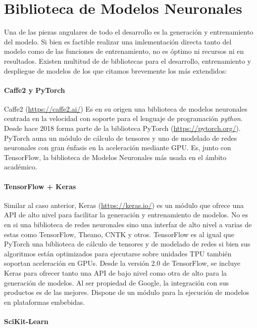 \section{Biblioteca de Modelos Neuronales} \label{sec:req:tflite}

Una de las piezas angulares de todo el desarrollo es la generación y entrenamiento del modelo. Si bien es factible realizar una imlementación directa tanto del modelo como de las funciones de entrenamiento, no es óptimo ni recursos ni en resultados. Existen multitud de de bibliotecas para el desarrollo, entrenamiento y despliegue de modelos de los que citamos brevemente los más extendidos:

\paragraph{Caffe2 y PyTorch}

Caffe2 (\url{https://caffe2.ai/}) Es en su origen una biblioteca de modelos neuronales centrada en la velocidad con soporte para el lenguaje de programación \textit{python}. Desde hace 2018 forma parte de la biblioteca PyTorch (\url{https://pytorch.org/}). PyTorch auna un módulo de cálculo de tensores y uno de modelado de redes neuronales con gran énfasis en la aceleración mediante GPU. Es, junto con TensorFlow, la biblioteca de Modelos Neuronales más usada en el ámbito académico.

\paragraph{TensorFlow + Keras}

Similar al caso anterior, Keras (\url{https://keras.io/}) es un módulo que ofrece una API de alto nivel para facilitar la generación y entrenamiento de modelos. No es en si una biblioteca de redes neuronales sino una interfaz de alto nivel a varias de estas como TensorFlow, Theano, CNTK y otros. TensorFlow es al igual que PyTorch una biblioteca de cálculo de tensores y de modelado de redes si bien sus algoritmos están optimizados para ejecutarse sobre unidades TPU también soportan aceleración en GPUs. Desde la versión 2.0 de TensorFlow, se incluye Keras para ofrecer tanto una API de bajo nivel como otra de alto para la generación de modelos. Al ser propiedad de Google, la integración con sus productos es de las mejores. Dispone de un módulo para la ejecución de modelos en plataformas embebidas.

\paragraph{SciKit-Learn}

